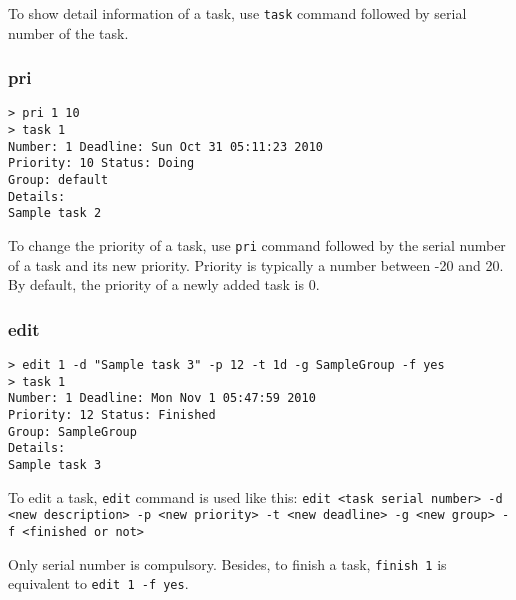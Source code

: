 \documentclass[12pt, a4paper]{article}
\begin{document}
To show detail information of a task, use \texttt{task} command followed by serial number of the task.


\subsubsection{pri}

\texttt{\textgreater \  pri 1 10\\
  \textgreater \ task 1\\
  Number:  1       Deadline:   Sun Oct 31 05:11:23 2010\\
  Priority:  10        Status:   Doing\\
  Group:  default\\
  Details:\\
  Sample task 2\\}

To change the priority of a task, use \texttt{pri} command followed by the serial number of a task and its new priority.
Priority is typically a number between -20 and 20. By default, the priority of a newly added task is 0.

\subsubsection{edit}

\texttt{\textgreater \ edit 1 -d "Sample task 3" -p 12 -t 1d\footnotemark \ -g SampleGroup -f yes\\
  \textgreater \ task 1\\
  Number:  1       Deadline:   Mon Nov  1 05:47:59 2010\\
  Priority:  12        Status:   Finished\\
  Group:  SampleGroup\\
  Details:\\
  Sample task 3\\}

To edit a task, \texttt{edit} command is used like this:
\texttt{edit \textless task serial number\textgreater \ -d \textless new description\textgreater \ -p \textless new priority\textgreater \ -t \textless new deadline\textgreater \ -g \textless new group\textgreater \ -f \textless finished or not\textgreater}

Only serial number is compulsory. Besides, to finish a task, \texttt{finish 1} is equivalent to \texttt{edit 1 -f yes}.
\end{document}
